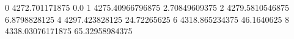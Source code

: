 0 4272.701171875 0.0
1 4275.40966796875 2.70849609375
2 4279.5810546875 6.8798828125
4 4297.423828125 24.72265625
6 4318.865234375 46.1640625
8 4338.03076171875 65.32958984375
